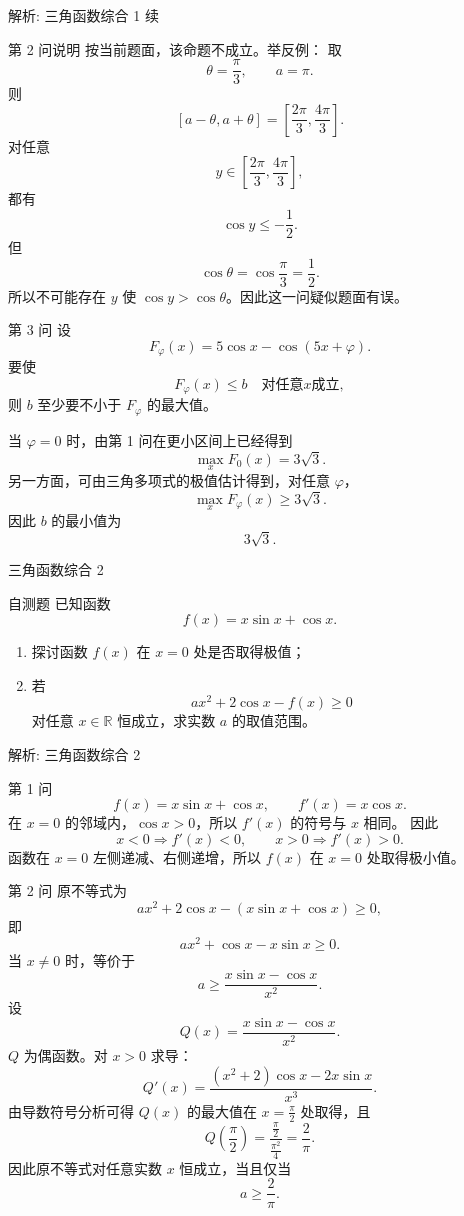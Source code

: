 ﻿\documentclass[aspectratio=169,10pt]{ctexbeamer}
\begin{document}
\begin{frame}[t,allowframebreaks]{解析: 三角函数综合 1 续}
\tiny
\begin{alertblock}{第 2 问说明}
按当前题面，该命题不成立。举反例：
取
\[
\theta=\frac\pi3,\qquad a=\pi.
\]
则
\[
[a-\theta,a+\theta]=\left[\frac{2\pi}{3},\frac{4\pi}{3}\right].
\]
对任意
\[
y\in\left[\frac{2\pi}{3},\frac{4\pi}{3}\right],
\]
都有
\[
\cos y\le -\frac12.
\]
但
\[
\cos\theta=\cos\frac\pi3=\frac12.
\]
所以不可能存在 $y$ 使 $\cos y>\cos\theta$。因此这一问疑似题面有误。
\end{alertblock}
\begin{block}{第 3 问}
设
\[
F_\varphi(x)=5\cos x-\cos(5x+\varphi).
\]
要使
\[
F_\varphi(x)\le b\quad 对任意 x 成立,
\]
则 $b$ 至少要不小于 $F_\varphi$ 的最大值。

当 $\varphi=0$ 时，由第 1 问在更小区间上已经得到
\[
\max_x F_0(x)=3\sqrt3.
\]
另一方面，可由三角多项式的极值估计得到，对任意 $\varphi$，
\[
\max_x F_\varphi(x)\ge3\sqrt3.
\]
因此 $b$ 的最小值为
\[
3\sqrt3.
\]
\end{block}
\end{frame}

\begin{frame}[t]{三角函数综合 2}
\large
\begin{block}{自测题}
已知函数
\[
f(x)=x\sin x+\cos x.
\]
\begin{enumerate}
  \item 探讨函数 $f(x)$ 在 $x=0$ 处是否取得极值；
  \item 若
  \[
  ax^2+2\cos x-f(x)\ge 0
  \]
  对任意 $x\in\mathbb{R}$ 恒成立，求实数 $a$ 的取值范围。
\end{enumerate}
\end{block}
\end{frame}

\begin{frame}[t,allowframebreaks]{解析: 三角函数综合 2}
\tiny
\begin{block}{第 1 问}
\[
f(x)=x\sin x+\cos x,\qquad f'(x)=x\cos x.
\]
在 $x=0$ 的邻域内，$\cos x>0$，所以 $f'(x)$ 的符号与 $x$ 相同。
因此
\[
x<0\Rightarrow f'(x)<0,\qquad x>0\Rightarrow f'(x)>0.
\]
函数在 $x=0$ 左侧递减、右侧递增，所以 $f(x)$ 在 $x=0$ 处取得极小值。
\end{block}
\begin{block}{第 2 问}
原不等式为
\[
ax^2+2\cos x-(x\sin x+\cos x)\ge0,
\]
即
\[
ax^2+\cos x-x\sin x\ge0.
\]
当 $x\ne0$ 时，等价于
\[
a\ge \frac{x\sin x-\cos x}{x^2}.
\]
设
\[
Q(x)=\frac{x\sin x-\cos x}{x^2}.
\]
$Q$ 为偶函数。对 $x>0$ 求导：
\[
Q'(x)=\frac{(x^2+2)\cos x-2x\sin x}{x^3}.
\]
由导数符号分析可得 $Q(x)$ 的最大值在 $x=\frac\pi2$ 处取得，且
\[
Q\left(\frac\pi2\right)=\frac{\frac\pi2}{\frac{\pi^2}{4}}=\frac2\pi.
\]
因此原不等式对任意实数 $x$ 恒成立，当且仅当
\[
a\ge\frac2\pi.
\]
\end{block}
\end{frame}
\end{document}
